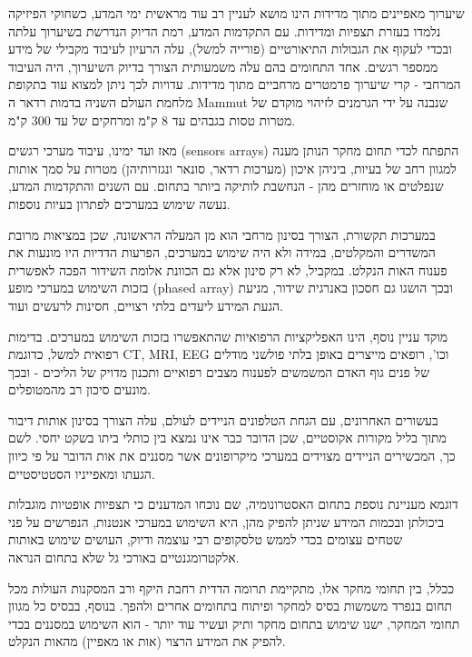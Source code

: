 שיערוך מאפיינים מתוך מדידות הינו מושא לעניין רב עוד מראשית ימי המדע, כשחוקי הפיזיקה נלמדו בעזרת תצפיות ומדידות.
עם התקדמות המדע, רמת הדיוק הנדרשת בשיערוך עלתה ובכדי לעקוף את הגבולות התיאורטיים (פורייה למשל), עלה הרעיון לעיבוד מקבילי של מידע ממספר רגשים.
אחד התחומים בהם עלה משמעותית הצורך בדיוק השיערוך, היה העיבוד המרחבי - קרי שיערוך פרמטרים מרחביים מתוך מדידות. 
עדויות לכך ניתן למצוא עוד בתקופת מלחמת העולם השניה בדמות רדאר ה
\textenglish{Mammut}
שנבנה על ידי הגרמנים לזיהוי מוקדם של מטרות טסות בגבהים עד 8 ק"מ ומרחקים של עד 300 ק"מ.
\par
מאז ועד ימינו, עיבוד מערכי רגשים
\textenglish{(sensors arrays)}
התפתח לכדי תחום מחקר הנותן מענה למגוון רחב של בעיות, ביניהן איכון (מערכות רדאר, סונאר ונגזרותיהן) מטרות על סמך אותות שנפלטים או מוחזרים מהן - הנחשבת לותיקה ביותר בתחום.
עם השנים והתקדמות המדע, נעשה שימוש במערכים לפתרון בעיות נוספות.
\par
במערכות תקשורת, הצורך בסינון מרחבי הוא מן המעלה הראשונה, שכן במציאות מרובת המשדרים והמקלטים, במידה ולא היה שימוש במערכים, הפרעות הדדיות היו מונעות את פענוח האות הנקלט. במקביל, לא רק סינון אלא גם הכוונת אלומת השידור הפכה לאפשרית בזכות השימוש במערכי מופע
\textenglish{(phased array)}
ובכך הושגו גם חסכון באנרגית שידור, מניעת הגעת המידע ליעדים בלתי רצויים, חסינות לרעשים ועוד.
\par
מוקד עניין נוסף, הינו האפליקציות הרפואיות שהתאפשרו בזכות השימוש במערכים. 
בדימות רפואית למשל, כדוגמת 
\textenglish{CT, MRI, EEG}
וכו', רופאים מייצרים באופן בלתי פולשני מודלים של פנים גוף האדם המשמשים לפענוח מצבים רפואיים ותכנון מדויק של הליכים - ובכך מונעים סיכון רב מהמטופלים.
\par
בעשורים האחרונים, עם הגחת הטלפונים הניידים לעולם, עלה הצורך בסינון אותות דיבור מתוך בליל מקורות אקוסטיים, שכן הדובר כבר אינו נמצא בין כותלי ביתו בשקט יחסי.
לשם כך, המכשירים הניידים מצוידים במערכי מיקרופונים אשר מסננים את אות הדובר על פי כיוון הגעתו ומאפייניו הסטטיסטיים.
\par
דוגמא מעניינת נוספת בתחום האסטרונומיה, שם נוכחו המדענים כי תצפיות אופטיות מוגבלות ביכולתן ובכמות המידע שניתן להפיק מהן, היא השימוש במערכי אנטנות, הנפרשים על פני שטחים עצומים בכדי לממש טלסקופים רבי עוצמה ודיוק, העושים שימוש באותות אלקטרומגנטיים באורכי גל שלא בתחום הנראה.
\par
ככלל, בין תחומי מחקר אלו, מתקיימת תרומה הדדית רחבת היקף ורב המסקנות העולות מכל תחום בנפרד משמשות בסיס למחקר ופיתוח בתחומים אחרים ולהפך. 
בנוסף, בבסיס כל מגוון תחומי המחקר, ישנו שימוש בתחום מחקר ותיק ועשיר עוד יותר - הוא השימוש במסננים בכדי להפיק את המידע הרצוי (אות או מאפיין) מהאות הנקלט.  
\par
